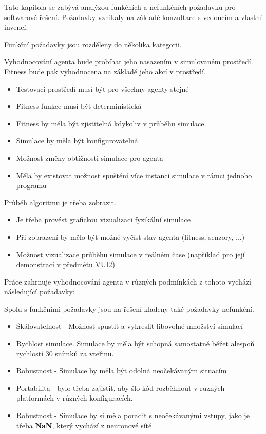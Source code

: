 Tato kapitola se zabývá analýzou funkčních a nefunkčních požadavků pro softwarové řešení. Požadavky vznikaly na základě konzultace s vedoucím a vlastní invencí.

Funkční požadavky jsou rozděleny do několika kategorii.

Vyhodnocování agenta bude probíhat jeho nasazením v simulovaném prostředí. Fitness bude pak vyhodnocena na základě jeho akcí v prostředí.
\begin{itemize}
	\item Testovací prostředí musí být pro všechny agenty stejné
	\item Fitness funkce musí být deterministická
	\item Fitness by měla být zjistitelná kdykoliv v průběhu simulace
	\item Simulace by měla být konfigurovatelná 
	\item Možnost změny obtížnosti simulace pro agenta
	\item Měla by existovat možnost spuštění více instancí simulace v rámci jednoho programu
\end{itemize}
Průběh algoritmu je třeba zobrazit.
\begin{itemize}
	\item Je třeba provést grafickou vizualizaci fyzikální simulace
	\item Při zobrazení by mělo být možné vyčíst stav agenta (fitness, senzory, ...) 
	\item Možnost vizualizace průběhu simulace v reálném čase (například pro její demonstraci v předmětu VUI2)
\end{itemize}

Práce zahrnuje vyhodnocování agenta v různých podmínkách z tohoto vychází následující požadavky:

\begin{itemize}
\end{itemize}

Spolu s funkčními požadavky jsou na řešení kladeny také požadavky nefunkční.
\begin{itemize}
	\item Škálovatelnost - Možnost spustit a vykreslit libovolné množství simulací
	\item Rychlost simulace. Simulace by měla být schopná samostatně běžet alespoň rychlostí 30 snímků za vteřinu.
	\item Robustnost - Simulace by měla být odolná neočekávaným situacím
	\item Portabilita - bylo třeba zajistit, aby šlo kód rozběhnout v různých platformách v různých konfiguracích.
	\item Robustnost - Simulace by si měla poradit s neočekávanými vstupy, jako je třeba \textbf{NaN}, který vychází z neuronové sítě
\end{itemize}

